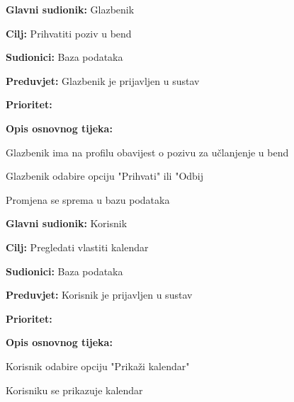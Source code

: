 \noindent {}
	\begin{packed_item}
		
		\item \textbf{Glavni sudionik: } Glazbenik
		\item \textbf{Cilj: } Prihvatiti poziv u bend
		\item \textbf{Sudionici:} Baza podataka
		\item \textbf{Preduvjet:} Glazbenik je prijavljen u sustav
		\item \textbf{Prioritet:} 
		\item \textbf{Opis osnovnog tijeka:} 
		
		\item[] \begin{packed_enum}
			
			\item Glazbenik ima na profilu obavijest o pozivu za učlanjenje u bend  
			\item Glazbenik odabire opciju "Prihvati" ili "Odbij
			\item Promjena se sprema u bazu podataka
		\end{packed_enum}
		
	\end{packed_item}
		
\noindent {}
	\begin{packed_item}
		
		\item \textbf{Glavni sudionik: } Korisnik
		\item \textbf{Cilj:} Pregledati vlastiti kalendar
		\item \textbf{Sudionici:} Baza podataka
		\item \textbf{Preduvjet:} Korisnik je prijavljen u sustav
		\item \textbf{Prioritet:} 
		\item \textbf{Opis osnovnog tijeka:} 
		
		\item[] \begin{packed_enum}
			
			\item Korisnik odabire opciju "Prikaži kalendar"
			\item Korisniku se prikazuje kalendar
		\end{packed_enum}  
	\end{packed_item}
	
